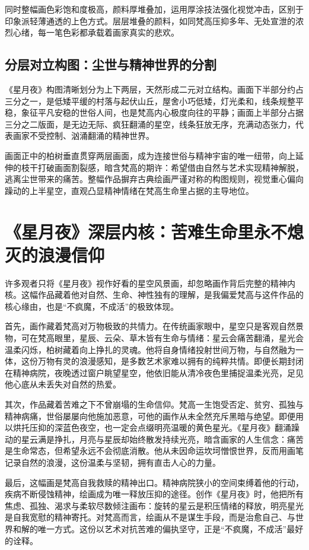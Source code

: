 \documentclass[12pt,a4paper]{article}
\begin{document}
同时整幅画色彩饱和度极高，颜料厚堆叠加，运用厚涂技法强化视觉冲击，区别于印象派轻薄通透的上色方式。层层堆叠的颜料，如同梵高压抑多年、无处宣泄的浓烈心绪，每一笔色彩都承载着画家真实的悲欢。

\subsection{分层对立构图：尘世与精神世界的分割}
《星月夜》构图清晰划分为上下两层，天然形成二元对立结构。画面下半部分约占三分之一，是低矮平缓的村落与起伏山丘，屋舍小巧低矮，灯光柔和，线条规整平稳，象征平凡安稳的世俗人间，也是梵高内心极度向往的平静；画面上半部分占据三分之二版面，是无边无际、疯狂翻涌的星空，线条狂放无序，充满动态张力，代表画家不受控制、汹涌翻涌的精神世界。

画面正中的柏树垂直贯穿两层画面，成为连接世俗与精神宇宙的唯一纽带，向上延伸的枝干打破画面割裂感，暗含梵高的期许：希望借由自然与艺术实现精神解脱，逃离尘世带来的痛苦。整幅作品摒弃古典绘画严谨对称的构图规则，视觉重心偏向躁动的上半星空，直观凸显精神情绪在梵高生命里占据的主导地位。

\section{《星月夜》深层内核：苦难生命里永不熄灭的浪漫信仰}
许多观者只将《星月夜》视作好看的星空风景画，却忽略画作背后完整的精神内核。这幅作品藏着他对自然、生命、神性独有的理解，是我偏爱梵高与这件作品的核心缘由，也是“不疯魔，不成活”的极致体现。

首先，画作藏着梵高对万物极致的共情力。在传统画家眼中，星空只是客观自然景物，可在梵高眼里，星辰、云朵、草木皆有生命与情绪：星云会痛苦翻涌，星光会温柔闪烁，柏树藏着向上挣扎的灵魂。他将自身情绪投射世间万物，与自然融为一体，这份万物有灵的浪漫感知，是多数艺术家难以拥有的纯粹共情。即便长期封闭在精神病院，夜晚透过窗户眺望星空，他依旧能从清冷夜色里捕捉温柔光亮，足见他心底从未丢失对自然的热爱。

其次，作品藏着苦难之下不曾崩塌的生命信仰。梵高一生饱受否定、贫穷、孤独与精神病痛，世俗屡屡向他施加恶意，可他的画作从未全然充斥黑暗与绝望。即便用以烘托压抑的深蓝色夜空，也一定会点缀明亮温暖的黄色星光。《星月夜》翻涌躁动的星云满是挣扎，月亮与星辰却始终散发持续光亮，暗含画家的人生信念：痛苦是生命常态，但希望永远不会彻底消散。他从未因命运坎坷憎恨世界，反而用画笔记录自然的浪漫，这份温柔与坚韧，拥有直击人心的力量。

最后，这幅画是梵高自我救赎的精神出口。精神病院狭小的空间束缚着他的行动，疾病不断侵蚀精神，绘画成为唯一释放压抑的途径。创作《星月夜》时，他把所有焦虑、孤独、渴求与柔软尽数倾注画布：旋转的星云是积压情绪的释放，明亮星光是自我宽慰的精神寄托。对梵高而言，绘画从不是谋生手段，而是治愈自己、与世界和解的唯一方式。这份以艺术对抗苦难的偏执坚守，正是“不疯魔，不成活”最好的诠释。
\end{document}
